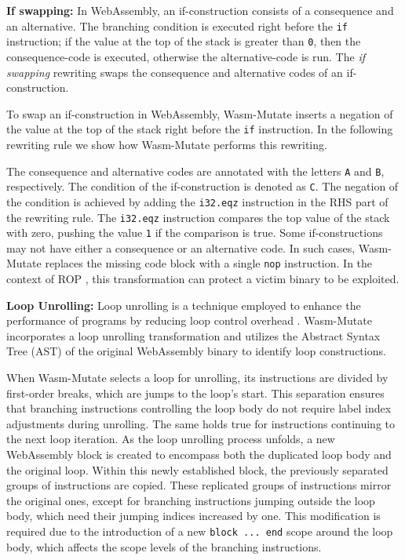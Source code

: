 \documentclass[a4paper,fleqn]{cas-dc}
\newcommand{\tool}{{\sc Wasm-Mutate}\xspace}
\begin{document}
\textbf{If swapping:} In WebAssembly, an if-construction consists of a consequence and an alternative. The branching condition is executed right before the \texttt{if} instruction; if the value at the top of the stack is greater than \texttt{0}, then the consequence-code is executed, otherwise the alternative-code is run.
The \emph{if swapping} rewriting swaps the consequence and alternative codes of an if-construction.


To swap an if-construction in WebAssembly, \tool inserts a negation of the value at the top of the stack right before the \texttt{if} instruction.
In the following rewriting rule we show how \tool performs this rewriting.

The consequence and alternative codes are annotated with the letters \texttt{A} and \texttt{B}, respectively.
The condition of the if-construction is denoted as \texttt{C}.
The negation of the condition is achieved by adding the \texttt{i32.eqz} instruction in the RHS part of the rewriting rule.
The \texttt{i32.eqz} instruction compares the top value of the stack with zero, pushing the value \texttt{1} if the comparison is true.
Some if-constructions may not have either a consequence or an alternative code.
In such cases, \tool replaces the missing code block with a single \texttt{nop} instruction.
In the context of ROP \cite{Swivel}, this transformation can protect a victim binary to be exploited. 



\textbf{Loop Unrolling:} 
Loop unrolling is a technique employed to enhance the performance of programs by reducing loop control overhead \cite{dongarra1979unrolling}. 
\tool incorporates a loop unrolling transformation and utilizes the Abstract Syntax Tree (AST) of the original WebAssembly binary to identify loop constructions. 

When \tool selects a loop for unrolling, its instructions are divided by first-order breaks, which are jumps to the loop's start. This separation ensures that branching instructions controlling the loop body do not require label index adjustments during unrolling. The same holds true for instructions continuing to the next loop iteration.
As the loop unrolling process unfolds, a new WebAssembly block is created to encompass both the duplicated loop body and the original loop. 
Within this newly established block, the previously separated groups of instructions are copied. 
These replicated groups of instructions mirror the original ones, except for branching instructions jumping outside the loop body, which need their jumping indices increased by one. This modification is required due to the introduction of a new \texttt{block ... end} scope around the loop body, which affects the scope levels of the branching instructions.
\end{document}
